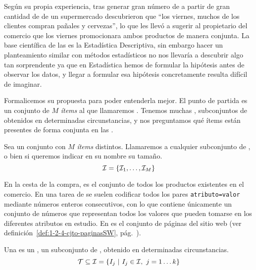 Según su propia experiencia, tras generar gran número de \ars a partir de gran cantidad de \transacciones de un supermercado descubrieron que "`los viernes, muchos de los clientes compran pañales y cervezas"', lo que les llevó a sugerir al propietario del comercio que los viernes promocionara ambos productos de manera conjunta. La base científica de las \ARs es la Estadística Descriptiva, sin embargo hacer un planteamiento similar con métodos estadísticos no nos llevaría a descubrir algo tan sorprendente ya que en Estadística hemos de formular la hipótesis antes de observar los datos, y llegar a formular esa hipótesis concretamente resulta difícil de imaginar.

Formalicemos su propuesta para poder entenderla mejor. El punto de partida es un conjunto de $M$ \emph{ítems} al que llamaremos \I. Tenemos muchas \transacciones, subconjuntos de \I obtenidos en determinadas circunstancias, y nos preguntamos qué ítems están presentes de forma conjunta en las \transacciones. 

\begin{Definition}
   Sea \I un conjunto con $M$ \emph{ítems} distintos. Llamaremos \itemset a cualquier subconjunto de \I, o bien \kitemset si queremos indicar en su nombre su tamaño.
   \begin{equation}\label{eq:1-3-2-poblacionDeItems}
     \I = \left\{\I_1,\ldots, \I_M\right\}
   \end{equation}
\label{def:1-3-2-poblacionDeItems}
\end{Definition}

En la cesta de la compra, \I es el conjunto de todos los productos existentes en el comercio. En una tarea de \clasificacion se suelen codificar todos los pares \texttt{atributo=valor} mediante números enteros consecutivos, con lo que \I contiene únicamente un conjunto de números que representan todos los valores que pueden tomarse en los diferentes atributos en estudio. En \wum es el conjunto de páginas del sitio web (ver definición~\ref{def:1-2-4-cjto-paginasSW}, pág.~\pageref{def:1-2-4-cjto-paginasSW}).

\begin{Definition}[\Transaccion]
   Una \transaccion \T es un \itemset, un subconjunto de \I, obtenido en determinadas circunstancias.
   \begin{equation}\label{eq:1-3-2-transaccion}
     \T \subseteq \I = \left\{I_j\ | \ I_j \in \I,\ j = 1 \ldots k\right\}
   \end{equation}
\label{def:1:3:2:transaccion}
\end{Definition}

